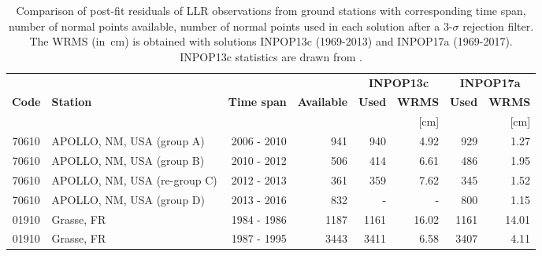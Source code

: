 \documentclass[fleqn,usenatbib,referee]{mnras}
\begin{document}
    \begin{table*}
    \centering
    \caption{Comparison of post-fit residuals of LLR observations from ground stations with corresponding time span, number of normal points available, number of normal points used in each solution after a 3-$\sigma$ rejection filter. The WRMS (in~cm) is obtained with solutions INPOP13c (1969-2013) and INPOP17a (1969-2017). INPOP13c statistics are drawn from \protect\cite{inpop13c}.}
    \label{NPT_span}
    \begin{tabular}{clrrrrrr}
    \toprule
     &                                                                    &                &                   & \multicolumn{2}{c}{\textbf{INPOP13c}}  & \multicolumn{2}{c}{\textbf{INPOP17a}}     \\
     \textbf{Code}             &   \textbf{Station}    & \textbf{Time span}                                 & \textbf{Available}         & \textbf{Used}      & \textbf{WRMS}     & \textbf{Used}      & \textbf{WRMS}  \\ \cmidrule{5-8}
                  &                                            &                                  &                     &           &  [cm]    &           & [cm]         \\ \midrule
    70610         & APOLLO, NM, USA (group A)            & 2006 - 2010                  &  941              & 940       & 4.92     &  929          &  1.27        \\ %
    70610         & APOLLO, NM, USA (group B)            & 2010 - 2012                  &  506              & 414       & 6.61     &  486          &  1.95        \\ %
    70610         & APOLLO, NM, USA (re-group C)        & 2012 - 2013                  &  361              & 359       & 7.62     &  345          &  1.52        \\ %
    70610         & APOLLO, NM, USA (group D)            & 2013 - 2016                  &  832              &  -        &  -       &  800          &  1.15        \\ 
    01910         & Grasse, FR                                 & 1984 - 1986                              &  1187             & 1161      & 16.02    &  1161         &  14.01       \\ %
    01910         & Grasse, FR                                 & 1987 - 1995                              &  3443             & 3411      & 6.58     &  3407         &  4.11        \\ %

\end{tabular}
\end{table*}
\end{document}
